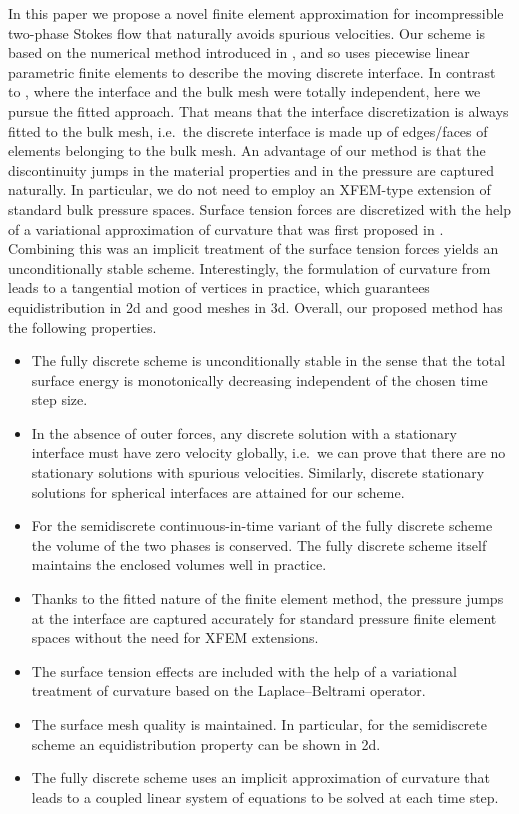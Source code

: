 \documentclass[a4paper,11pt,onecolumn]{article}
\begin{document}
In this paper we propose a novel finite element approximation for
incompressible two-phase Stokes flow that naturally avoids spurious
velocities. Our scheme is based on the numerical method introduced in
\cite{spurious}, and so uses piecewise linear parametric finite elements to
describe the moving discrete interface. In contrast to \cite{spurious}, where
the interface and the bulk mesh were totally independent, here we pursue the
fitted approach. That means that the interface discretization is always fitted
to the bulk mesh, i.e.\ the discrete interface is made up of edges/faces of
elements belonging to the bulk mesh. An advantage of our method is that the
discontinuity jumps in the material properties and in the pressure are captured
naturally. In particular, we do not need to employ an XFEM-type extension of
standard bulk pressure spaces. Surface tension forces are discretized with the
help of a variational approximation of curvature that was first proposed in
\cite{triplej,gflows3d}. Combining this was an implicit treatment of the
surface tension forces yields an unconditionally stable scheme. Interestingly,
the formulation of curvature from \cite{triplej} leads to a tangential motion
of vertices in practice, which guarantees equidistribution in 2d and good
meshes in 3d. Overall, our proposed method has the following properties.
\begin{itemize}
\item The fully discrete scheme is unconditionally stable in the sense that the
total surface energy is monotonically decreasing independent of the chosen time
step size.
\item In the absence of outer forces, any discrete solution with a stationary
interface must have zero velocity globally, i.e.\ we can prove that there are
no stationary solutions with spurious velocities. Similarly, discrete
stationary solutions for spherical interfaces are attained for our scheme.
\item For the semidiscrete continuous-in-time variant of the fully discrete
scheme the volume
of the two phases is conserved. The fully discrete scheme itself maintains the
enclosed volumes well in practice.
\item Thanks to the fitted nature of the finite element method, the pressure
jumps at the interface are captured accurately for standard pressure finite
element spaces without the need for XFEM extensions.
\item The surface tension effects are included with the help of a variational
treatment of curvature based on the Laplace--Beltrami operator.
\item The surface mesh quality is maintained. In particular, for the
semidiscrete scheme an equidistribution property can be shown in 2d.
\item The fully discrete scheme uses an implicit approximation of curvature
that leads to a coupled linear system of equations to be solved at each time
step.
\end{itemize}
\end{document}
